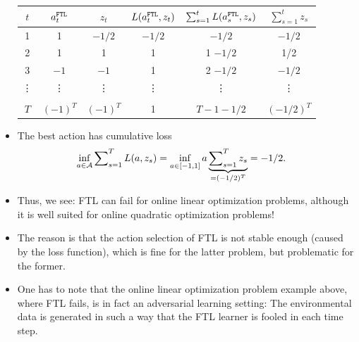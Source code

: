 \begin{vbframe}
\begin{itemize}
		\begin{centering}
			 \begin{tabular}{c|c|c|c|c|c} 
				$t$ & $a_t^{\texttt{FTL}}$ & $z_t$ & $L(a_t^{\texttt{FTL}},z_t)$  &  $\sum_{s=1}^t L(a_s^{\texttt{FTL}},z_s)$ & $\sum_{s=1}^t z_s $ \\
				\hline
				1 & 1 & $-1/2$ & $-1/2$ & $-1/2$ & $-1/2$  \\
				\hline
				2 & 1 & 1 & 1 & 1 $- 1/2$ & 1/2 \\
				\hline
				3 & $-1$ & $-1$ & 1 & 2 $- 1/2$ & $-1/2$ \\
				\hline
				\vdots & \vdots & \vdots & \vdots & \vdots & \vdots \\
				\hline 
				& & & & &\\
				$T$ & $(-1)^T$ & $(-1)^T$ & 1 & $T-1-1/2$ & $(-1/2)^{T}$ \\
			\end{tabular}
		\end{centering}
%		 
		\item The best action has cumulative loss 		
%		
		\begin{align*}
			\inf_{a \in \mathcal{A}} \sum\nolimits_{s=1}^T L(a,z_s) &= \inf_{a \in [-1,1]} a \underbrace{\sum\nolimits_{s=1}^T  z_s}_{=(-1/2)^{T}} = -1/2.
		\end{align*}
		\small
%		
		 \item Thus, we see: FTL can fail for {\color{red} online linear optimization problems}, although it is well suited for {\color{blue}  online quadratic optimization problems}!
		 \item The reason is that the action selection of FTL is not stable enough (caused by the loss function), which is fine for {\color{blue} the latter problem}, but problematic for {\color{red} the former}.
		\item One has to note that the online linear optimization problem example above, where FTL fails, is in fact an adversarial learning setting: The environmental data is generated in such a way that the FTL learner is fooled in each time step.
%		
	\end{itemize}
\end{vbframe}



